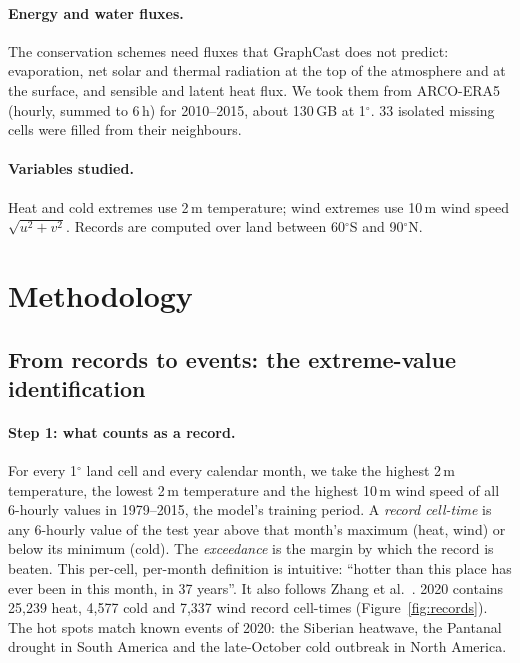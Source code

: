 \documentclass{article}
\begin{document}
\paragraph{Energy and water fluxes.}
The conservation schemes need fluxes that GraphCast does not predict: evaporation, net solar and thermal radiation at the top of the atmosphere and at the surface,
and sensible and latent heat flux. We took them from ARCO-ERA5 (hourly, summed to 6\,h) for 2010--2015, about 130\,GB at 1$^\circ$.
33 isolated missing cells were filled from their neighbours.

\paragraph{Variables studied.}
Heat and cold extremes use 2\,m temperature; wind extremes use 10\,m wind speed $\sqrt{u^2+v^2}$. Records are computed over land between 60$^\circ$S and 90$^\circ$N.

\section{Methodology}
\label{sec:method}

\subsection{From records to events: the extreme-value identification}
\label{sec:events}

\paragraph{Step 1: what counts as a record.}
For every 1$^\circ$ land cell and every calendar month, we take the highest 2\,m temperature, the lowest 2\,m temperature and the highest 10\,m wind speed
of all 6-hourly values in 1979--2015, the model's training period. A \emph{record cell-time} is any 6-hourly value of the test year above that
month's maximum (heat, wind) or below its minimum (cold). The \emph{exceedance} is the margin by which the record is beaten.
This per-cell, per-month definition is intuitive: ``hotter than this place has ever been in this month, in 37 years''.
It also follows Zhang et al.~\cite{zhang2026records}. 2020 contains 25{,}239 heat, 4{,}577 cold and 7{,}337 wind record cell-times (Figure~\ref{fig:records}).
The hot spots match known events of 2020: the Siberian heatwave, the Pantanal drought in South America and the late-October cold outbreak in North America.
\end{document}
